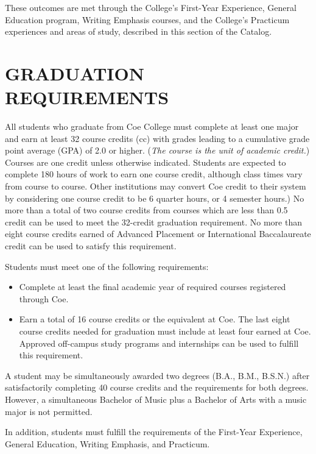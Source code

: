\documentclass[
  letterpaper,
]{scrbook}
\providecommand{\tightlist}{%
  \setlength{\itemsep}{0pt}\setlength{\parskip}{0pt}}
\begin{document}
These outcomes are met through the College's First-Year Experience,
General Education program, Writing Emphasis courses, and the College's
Practicum experiences and areas of study, described in this section of
the Catalog.

\chapter{GRADUATION REQUIREMENTS}\label{sec-graduation-requirements}

All students who graduate from Coe College must complete at least one
major and earn at least 32 course credits (cc) with grades leading to a
cumulative grade point average (GPA) of 2.0 or higher. (\emph{The course
is the unit of academic credit.}) Courses are one credit unless
otherwise indicated. Students are expected to complete 180 hours of work
to earn one course credit, although class times vary from course to
course. Other institutions may convert Coe credit to their system by
considering one course credit to be 6 quarter hours, or 4 semester
hours.) No more than a total of two course credits from courses which
are less than 0.5 credit can be used to meet the 32-credit graduation
requirement. No more than eight course credits earned of Advanced
Placement or International Baccalaureate credit can be used to satisfy
this requirement.

Students must meet one of the following requirements:

\begin{itemize}
\tightlist
\item
  Complete at least the final academic year of required courses
  registered through Coe.
\item
  Earn a total of 16 course credits or the equivalent at Coe. The last
  eight course credits needed for graduation must include at least four
  earned at Coe. Approved off-campus study programs and internships can
  be used to fulfill this requirement.
\end{itemize}

A student may be simultaneously awarded two degrees (B.A., B.M., B.S.N.)
after satisfactorily completing 40 course credits and the requirements
for both degrees. However, a simultaneous Bachelor of Music plus a
Bachelor of Arts with a music major is not permitted.

In addition, students must fulfill the requirements of the First-Year
Experience, General Education, Writing Emphasis, and Practicum.
\end{document}
